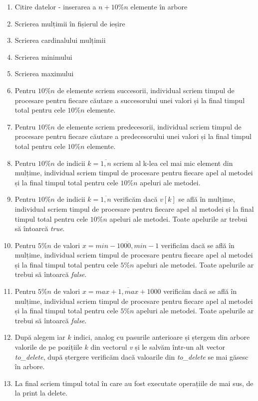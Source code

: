\documentclass[]{report}
\begin{document}
	\begin{enumerate}
		\item Citire datelor - inserarea a $n+10\%n$ elemente în arbore
		\item Scrierea mulțimii în fișierul de ieșire
		\item Scrierea cardinalului mulțimii
		\item Scrierea minimului
		\item Scrierea maximului
		\item Pentru $10\%n$ de elemente scriem succesorii, individual scriem
			timpul de procesare pentru fiecare căutare a succesorului unei valori
			și la final timpul total pentru cele $10\%n$ elemente.
		\item Pentru $10\%n$ de elemente scriem predecesorii, individual scriem
			timpul de procesare pentru fiecare căutare a predecesorului unei valori
			și la final timpul total pentru cele $10\%n$ elemente.
		\item Pentru $10\%n$ de indicii $k=\overline{1, n}$ scriem al k-lea cel
			mai mic element din mulțime, individual scriem timpul de procesare 
			pentru fiecare apel al metodei și la final timpul total pentru cele
			$10\%n$ apeluri ale metodei.
		\item Pentru $10\%n$ de indicii $k=\overline{1, n}$ verificăm dacă 
			$v[k]$ se află în mulțime, individual scriem timpul de procesare 
			pentru fiecare apel al metodei și la final timpul total pentru cele
			$10\%n$ apeluri	ale metodei. Toate apelurile ar trebui să întoarcă
			\emph{true}.
		\item Pentru $5\%n$ de valori $x=\overline{min-1000, min-1}$ verificăm
			dacă se află în mulțime, individual scriem timpul de procesare pentru
			fiecare apel al metodei și la final timpul total pentru cele $5\%n$
			apeluri ale metodei. Toate apelurile ar trebui să întoarcă \emph{false}.
		\item Pentru $5\%n$ de valori $x=\overline{max+1, max+1000}$ verificăm
			dacă se află în mulțime, individual scriem timpul de procesare pentru
			fiecare apel al metodei și la final timpul total pentru cele $5\%n$
			apeluri ale metodei. Toate apelurile ar trebui să întoarcă \emph{false}.
		\item După alegem iar $k$ indici, analog cu pasurile anterioare
			și ștergem din arbore valorile de pe pozițiile $k$ din vectorul 
			\emph{v} și le salvăm într-un alt vector \emph{to\_delete}, după 
			ștergere verificăm dacă valoarile din \emph{to\_delete} se mai găsesc
			în arbore.
		\item La final scriem timpul total în care au fost executate operațiile
			de mai sus, de la print la delete.
	\end{enumerate}
\end{document}
